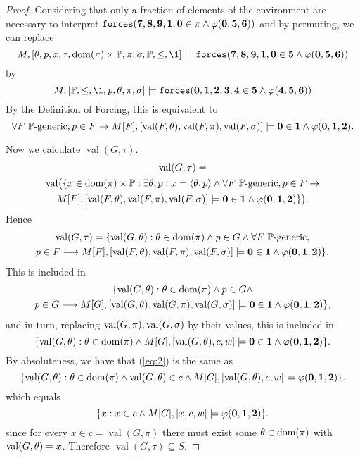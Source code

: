 \documentclass[11pt,english]{article}
\renewcommand{\PP}{\mathbb{P}}
\newcommand{\forceisa}{\mathtt{forces}}
\newcommand{\dB}[1]{\mathbf{#1}}
\DeclareMathOperator{\val}{val}
\begin{document}
\begin{proof}
  Considering that only a fraction of elements
  of the environment  are necessary to interpret
  $\forceisa(\dB{7},\dB{8},\dB{9},\dB{1},\dB{0}\in\pi\y\phi(\dB{0},\dB{5},\dB{6}))$ and by permuting, we can
  replace
  \[
  M, [\th,p,x,\tau,\dom(\pi)\times\PP,\pi,\sig,\PP,\leq,\1]\models
  \forceisa(\dB{7},\dB{8},\dB{9},\dB{1},\dB{0}\in \dB{5} \y\phi(\dB{0},\dB{5},\dB{6}))
  \]
  by
  \[
  M,[\PP,\leq,\1,p,\th,\pi,\sig]\models
  \forceisa(\dB{0},\dB{1},\dB{2},\dB{3},\dB{4}\in \dB{5} \y\phi(\dB{4},\dB{5},\dB{6}))
  \]
  By the Definition of Forcing, this is equivalent to
  \[
  \forall F\ \PP\text{-generic}, p\in F \limp
  M[F],[\val(F,\th),\val(F,\pi),\val(F,\sig)]\models
  \dB{0}\in\dB{1}  \y\phi(\dB{0},\dB{1},\dB{2}).
  \]

  Now we calculate $\val(G,\tau)$.
  \begin{multline*}
    \val(G,\tau) = \\
    \val\bigl(\{x\in\dom(\pi)\times\PP : \exists \th,p : x =\lb\th,p\rb
    \y \forall F\ \PP\text{-generic}, p\in F \limp \\    
    M[F],[\val(F,\th),\val(F,\pi),\val(F,\sig)]\models
    \dB{0}\in \dB{1} \y\phi(\dB{0},\dB{1},\dB{2})\}\bigr).
  \end{multline*}
  Hence
  \begin{multline}\label{eq:val_tau}
    \val(G,\tau) = 
    \{\val(G,\th): \th\in\dom(\pi) \y  p \in G 
    \y \forall F\ \PP\text{-generic}, \\
   p\in F \longrightarrow
  M[F],[\val(F,\th),\val(F,\pi),\val(F,\sig)]\models
  \dB{0}\in \dB{1} \y\phi(\dB{0},\dB{1},\dB{2})\}.
  \end{multline}
  This is included in
  \begin{multline*}
    \{\val(G,\th): \th\in\dom(\pi) \y  p \in G 
    \y  \\
   p\in G \longrightarrow
   M[G],[\val(G,\th),\val(G,\pi),\val(G,\sig)]\models
   \dB{0}\in \dB{1} \y\phi(\dB{0},\dB{1},\dB{2})\},
  \end{multline*}
  and in turn,  replacing $\val(G,\pi),\val(G,\sig)$ by their values,
  this is included  in 
  \begin{equation}\label{eq:2}
    \{\val(G,\th): \th\in\dom(\pi)
    \y 
   M[G],[\val(G,\th),c,w]\models
   \dB{0}\in \dB{1} \y\phi(\dB{0},\dB{1},\dB{2})\}.
  \end{equation}
  By absoluteness, we have that (\ref{eq:2}) is the same as
  \[
    \{\val(G,\th): \th\in\dom(\pi)
    \y \val(G,\th)\in c \y 
   M[G],[\val(G,\th),c,w]\models
   \phi(\dB{0},\dB{1},\dB{2})\}.
  \]
  which equals 
  \[
    \{x: x\in c \y 
    M[G],[x,c,w]\models
   \phi(\dB{0},\dB{1},\dB{2})\}.
  \]
  since for every $x\in c=\val(G,\pi)$ there must
  exist some $\theta\in\operatorname{dom}(\pi)$ with $\val(G,\th)=x$. Therefore
  $\val(G,\tau)\subseteq S$.


\end{proof}
\end{document}
